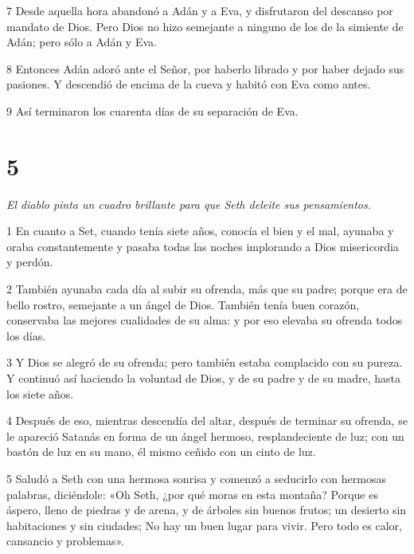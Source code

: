\par 7 Desde aquella hora abandonó a Adán y a Eva, y disfrutaron del descanso por mandato de Dios. Pero Dios no hizo semejante a ninguno de los de la simiente de Adán; pero sólo a Adán y Eva.

\par 8 Entonces Adán adoró ante el Señor, por haberlo librado y por haber dejado sus pasiones. Y descendió de encima de la cueva y habitó con Eva como antes.

\par 9 Así terminaron los cuarenta días de su separación de Eva.

\chapter{5}

\par \textit{El diablo pinta un cuadro brillante para que Seth deleite sus pensamientos.}

\par 1 En cuanto a Set, cuando tenía siete años, conocía el bien y el mal, ayunaba y oraba constantemente y pasaba todas las noches implorando a Dios misericordia y perdón.

\par 2 También ayunaba cada día al subir su ofrenda, más que su padre; porque era de bello rostro, semejante a un ángel de Dios. También tenía buen corazón, conservaba las mejores cualidades de su alma: y por eso elevaba su ofrenda todos los días.

\par 3 Y Dios se alegró de su ofrenda; pero también estaba complacido con su pureza. Y continuó así haciendo la voluntad de Dios, y de su padre y de su madre, hasta los siete años.

\par 4 Después de eso, mientras descendía del altar, después de terminar su ofrenda, se le apareció Satanás en forma de un ángel hermoso, resplandeciente de luz; con un bastón de luz en su mano, él mismo ceñido con un cinto de luz.

\par 5 Saludó a Seth con una hermosa sonrisa y comenzó a seducirlo con hermosas palabras, diciéndole: «Oh Seth, ¿por qué moras en esta montaña? Porque es áspero, lleno de piedras y de arena, y de árboles sin buenos frutos; un desierto sin habitaciones y sin ciudades; No hay un buen lugar para vivir. Pero todo es calor, cansancio y problemas».


